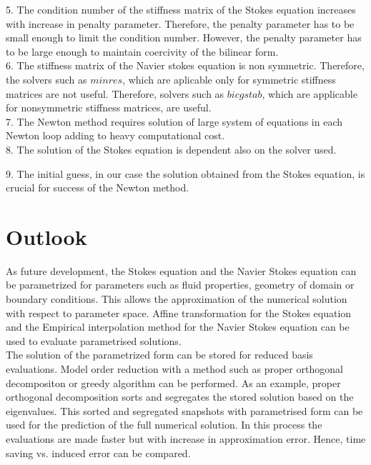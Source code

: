 \documentclass[a4paper]{book}
\begin{document}
5. The condition number of the stiffness matrix of the Stokes equation increases with increase in penalty parameter. Therefore, the penalty parameter has to be small enough to limit the condition number. However, the penalty parameter has to be large enough to maintain coercivity of the bilinear form. \\

6. The stiffness matrix of the Navier stokes equation is non symmetric. Therefore, the solvers such as $minres$, which are aplicable only for symmetric stiffness matrices are not useful. Therefore, solvers such as $bicgstab$, which are applicable for nonsymmetric stiffness matrices, are useful.\\

7. The Newton method requires solution of large system of equations in each Newton loop adding to heavy computational cost.\\

8. The solution of the Stokes equation is dependent also on the solver used.

9. The initial guess, in our case the solution obtained from the Stokes equation, is crucial for success of the Newton method.\\

\section{Outlook}

As future development, the Stokes equation and the Navier Stokes equation can be parametrized for parameters such as fluid properties, geometry of domain or boundary conditions. This allows the approximation of the numerical solution with respect to parameter space. Affine transformation for the Stokes equation and the Empirical interpolation method for the Navier Stokes equation can be used to evaluate parametrised solutions. \\

The solution of the parametrized form can be stored for reduced basis evaluations. Model order reduction with a method such as proper orthogonal decompositon or greedy algorithm can be performed. As an example, proper orthogonal decomposition sorts and segregates the stored solution based on the eigenvalues. This sorted and segregated snapshots with parametrised form can be used for the prediction of the full numerical solution. In this process the evaluations are made faster but with increase in approximation error. Hence, time saving vs. induced error can be compared.
\end{document}
